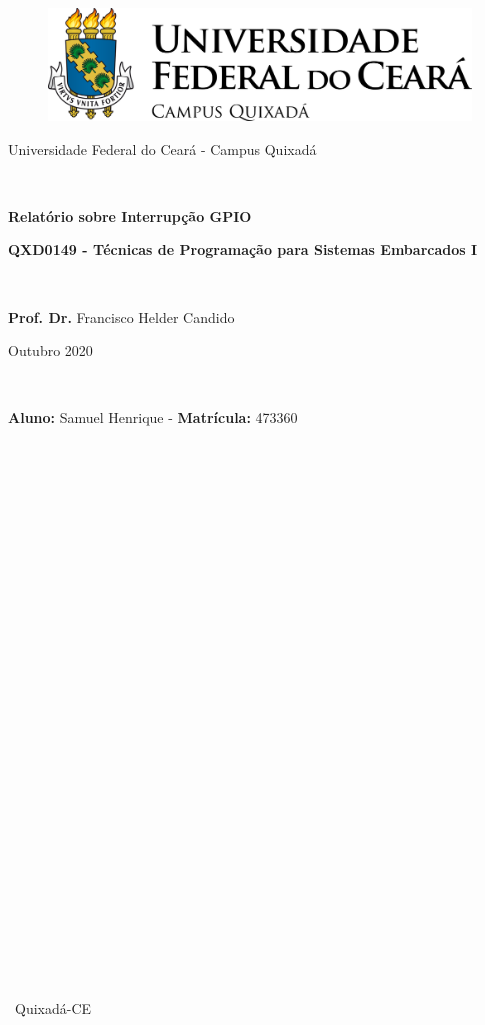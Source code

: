 \documentclass[12pt]{article}
\begin{document}
	\begin{center}
		\begin{figure}[h!]
			\centering
			\includegraphics[scale=0.4]{logoufcquix.png}
			
		\end{figure}
		
		\large{Universidade Federal do Ceará - Campus Quixadá}
		\
		
		\
		
		\Large {\textbf{Relatório sobre Interrupção GPIO}} 
		
		\textbf{QXD0149 - Técnicas de Programação para Sistemas Embarcados I}
		
		\
		
		\large{\textbf{Prof. Dr.} Francisco Helder Candido}
		
		Outubro 2020
		
		\
		
		\textbf{Aluno:} Samuel Henrique - \textbf{Matrícula:} 473360 \\
		
		\
		
		\
		
		\
	\end{center}
	\begin{center}
		
		\
		
		\
		
		\
		
		\
		
		\
		
		\
		
		\
		
		\
		
		\
		
		\
		
		\
		
		\
		
		\
		
		\
		
		\
		Quixadá-CE \ \ \  
	\end{center} \par
	\thispagestyle{empty}
	\newpage
	\onehalfspacing
	\tableofcontents
	\thispagestyle{empty}
	\newpage
	
\end{document}
